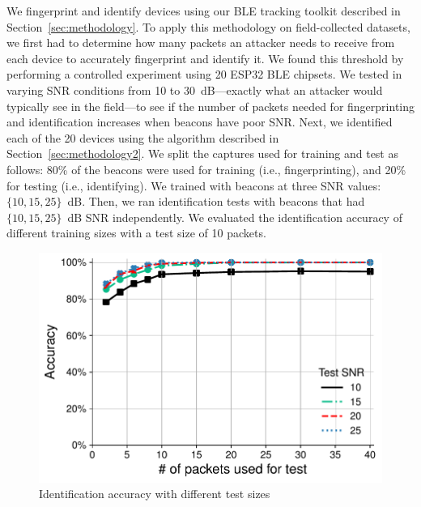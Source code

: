  
We fingerprint and identify devices using our BLE tracking toolkit
described in Section~\ref{sec:methodology}.
%
To apply this methodology on field-collected datasets, we first had to determine how many packets an
attacker needs to receive from each device to accurately 
fingerprint and identify it. We
found this threshold by performing a controlled experiment using 
20 ESP32 BLE chipsets. We tested in varying SNR conditions from 10
to 30~dB---exactly what an attacker would typically see in the field---to
see if the number of packets needed for fingerprinting and identification increases when 
beacons have poor SNR.
Next, we identified each of the 20 devices using the algorithm
described in Section~\ref{sec:methodology2}. We split the captures used for
training and test as follows: 80\% of the beacons were used for training (i.e., fingerprinting), and
20\% for testing (i.e., identifying).  We trained with beacons at three SNR values:
$\{10,15,25\}$~dB. Then, we ran identification tests with beacons that had $\{10,15,25\}$~dB SNR
independently. We evaluated the identification accuracy of different training sizes with a test size of 10
packets. %



\begin{figure}
    \centering
    \includegraphics[width=\linewidth]{bletracking/plots/accuracy_esp_test2.pdf}
    \caption{Identification accuracy with different test sizes}
    \label{fig:esp_test}
\end{figure}


